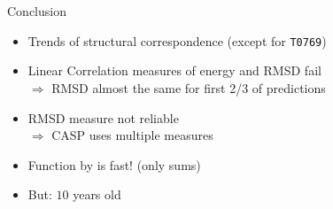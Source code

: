 \section{}

\begin{frame}{Conclusion}
    \begin{itemize}[<+->]
        \item Trends of structural correspondence (except for \texttt{T0769})
        \item Linear Correlation measures of energy and RMSD fail\\
        $\Rightarrow$ RMSD almost the same for first 2/3 of predictions
        \item RMSD measure not reliable\\
        $\Rightarrow$ CASP uses multiple measures
        \item Function by \cite{Zhang1997} is fast! (only sums)
        \item But: $10$ years old
    \end{itemize}
\end{frame}
